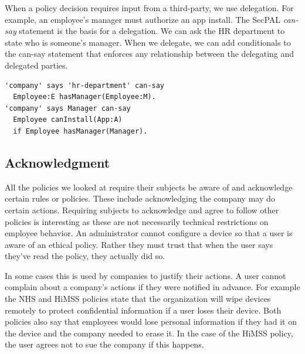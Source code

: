 \documentclass[thesis.tex]{subfiles}
\begin{document}
When a policy decision requires input from a third-party, we use delegation.
For example, an employee's manager must authorize an app install.
The SecPAL \emph{can-say} statement is the basis for a delegation.
We can ask the HR department to state who is someone's manager.
When we delegate, we can add conditionals to the can-say
statement that enforces any relationship between the delegating and
delegated parties.

\begin{lstlisting}
'company' says 'hr-department' can-say
  Employee:E hasManager(Employee:M).
'company' says Manager can-say
  Employee canInstall(App:A)
  if Employee hasManager(Manager).
\end{lstlisting}

\subsection{Acknowledgment}

All the policies we looked at require their subjects be aware of and acknowledge
certain rules or policies. These include acknowledging the company may do
certain actions. Requiring subjects to acknowledge and agree to follow other
policies is interesting as these are not necessarily technical restrictions on
employee behavior. An administrator cannot configure a device so that a user is
aware of an ethical policy. Rather they must trust that when the
user says they've read the policy, they actually did so.

In some cases this is used by companies to justify their actions.  A
user cannot complain about a company's actions if they were notified
in advance.  For example the NHS and \ac{HiMSS} policies state that
the organization will wipe devices remotely to protect confidential
information if a user loses their device.  Both policies also say that
employees would lose personal information if they had it on the device
and the company needed to erase it.  In the case of the \ac{HiMSS} policy, the user agrees not to
sue the company if this happens.
\end{document}
